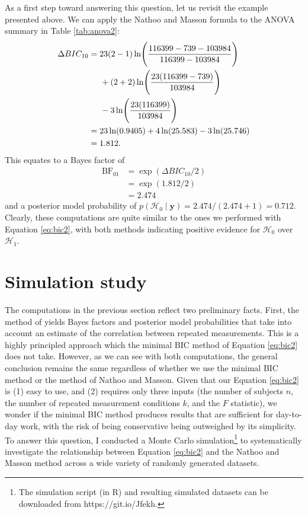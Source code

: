 \documentclass[12pt,twoside,a4paper]{article}
\begin{document}
As a first step toward answering this question, let us revisit the example presented above. We can apply the Nathoo and Masson formula to the ANOVA summary in Table \ref{tab:anova2}:%
\begin{align*}
  \Delta BIC_{10} & = 23(2-1)\ln\Biggl(\frac{116399-739-103984}{116399-103984}\Biggr)\\
                  & \hspace{5mm} + (2+2)\ln\Biggl(\frac{23(116399-739)}{103984}\Biggr)\\
                  & \hspace{5mm} -3\ln\Biggl(\frac{23(116399)}{103984}\Biggr)\\
                  &= 23\ln(0.9405) + 4\ln(25.583) - 3\ln(25.746)\\
  &= 1.812.
\end{align*}%
This equates to a Bayes factor of%
\begin{align*}
  \text{BF}_{01} & =\exp(\Delta BIC_{10}/2)\\
         & = \exp(1.812/2) \\
         & = 2.474
\end{align*}%
and a posterior model probability of $p(\mathcal{H}_0\mid \bm{y})=2.474/(2.474+1)= 0.712$.  Clearly, these computations are quite similar to the ones we performed with Equation \ref{eq:bic2}, with both methods indicating positive evidence for $\mathcal{H}_0$ over $\mathcal{H}_1$.

\section{Simulation study}

The computations in the previous section reflect two preliminary facts. First, the method of \citet{nathoo2016} yields Bayes factors and posterior model probabilities that take into account an estimate of the correlation between repeated measurements. This is a highly principled approach which the minimal BIC method of Equation \ref{eq:bic2} does not take. However, as we can see with both computations, the general conclusion remains the same regardless of whether we use the minimal BIC method or the method of Nathoo and Masson. Given that our Equation \ref{eq:bic2} is (1) easy to use, and (2) requires only three inputs (the number of subjects $n$, the number of repeated measurement conditions $k$, and the $F$ statistic), we wonder if the minimal BIC method produces results that are sufficient for day-to-day work, with the risk of being conservative being outweighed by its simplicity. To answer this question, I conducted a Monte Carlo simulation\footnote{The simulation script (in R) and resulting simulated datasets can be downloaded from https://git.io/Jfekh.} to systematically investigate the relationship between Equation \ref{eq:bic2} and the Nathoo and Masson method across a wide variety of randomly generated datasets. 
\end{document}
